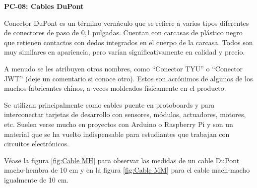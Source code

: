     \textbf{PC-08: Cables DuPont }
    
    Conector DuPont es un término vernáculo que se refiere a varios tipos diferentes de conectores de paso de 0,1 pulgadas. Cuentan con carcasas de plástico negro que retienen contactos con dedos integrados en el cuerpo de la carcasa. Todos son muy similares en apariencia, pero varían significativamente en calidad y precio.
    
    A menudo se les atribuyen otros nombres, como “Conector TYU” o “Conector JWT” (deje un comentario si conoce otro). Estos son acrónimos de algunos de los muchos fabricantes chinos, a veces moldeados físicamente en el producto. \cite{Mateo}
    
    Se utilizan principalmente como cables puente en protoboards y para interconectar tarjetas de desarrollo con sensores, módulos, actuadores, motores, etc. Suelen verse mucho en proyectos con Arduino o Raspberry Pi y son un material que se ha vuelto indispensable para estudiantes que trabajan con circuitos electrónicos. 
    
    Véase la figura \ref{fig:Cable MH} para observar las medidas de un cable DuPont macho-hembra de 10 cm y en la figura \ref{fig:Cable MM} para el cable mach-macho igualmente de 10 cm.
    
    
    
